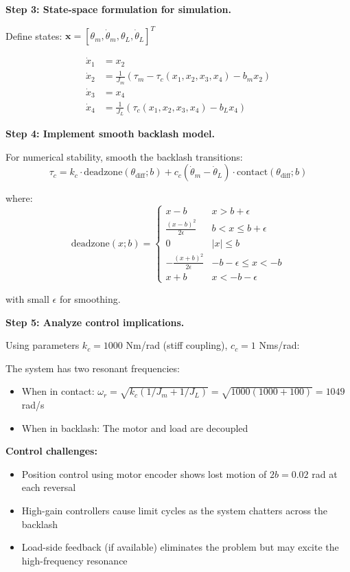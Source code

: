 \begin{example}
\textbf{Step 3: State-space formulation for simulation.}

Define states: $\mathbf{x} = [\theta_m, \dot{\theta}_m, \theta_L, \dot{\theta}_L]^T$

\begin{align}
\dot{x}_1 &= x_2 \\
\dot{x}_2 &= \frac{1}{J_m}(\tau_m - \tau_c(x_1, x_2, x_3, x_4) - b_m x_2) \\
\dot{x}_3 &= x_4 \\
\dot{x}_4 &= \frac{1}{J_L}(\tau_c(x_1, x_2, x_3, x_4) - b_L x_4)
\end{align}

\textbf{Step 4: Implement smooth backlash model.}

For numerical stability, smooth the backlash transitions:
\begin{equation}
\tau_c = k_c \cdot \text{deadzone}(\theta_{\text{diff}}; b) + c_c(\dot{\theta}_m - \dot{\theta}_L) \cdot \text{contact}(\theta_{\text{diff}}; b)
\end{equation}

where:
\begin{equation}
\text{deadzone}(x; b) = \begin{cases}
x - b & x > b + \epsilon \\
\frac{(x-b)^2}{2\epsilon} & b < x \leq b + \epsilon \\
0 & |x| \leq b \\
-\frac{(x+b)^2}{2\epsilon} & -b - \epsilon \leq x < -b \\
x + b & x < -b - \epsilon
\end{cases}
\end{equation}

with small $\epsilon$ for smoothing.

\textbf{Step 5: Analyze control implications.}

Using parameters $k_c = 1000$ Nm/rad (stiff coupling), $c_c = 1$ Nms/rad:

The system has two resonant frequencies:
\begin{itemize}
    \item When in contact: $\omega_r = \sqrt{k_c(1/J_m + 1/J_L)} = \sqrt{1000(1000 + 100)} = 1049$ rad/s
    \item When in backlash: The motor and load are decoupled
\end{itemize}

\textbf{Control challenges:}
\begin{itemize}
    \item Position control using motor encoder shows lost motion of $2b = 0.02$ rad at each reversal
    \item High-gain controllers cause limit cycles as the system chatters across the backlash
    \item Load-side feedback (if available) eliminates the problem but may excite the high-frequency resonance
\end{itemize}


\end{example}
